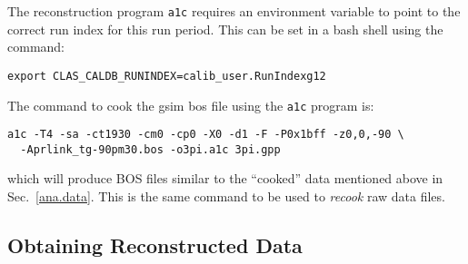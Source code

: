 The reconstruction program \texttt{a1c} requires an environment variable to point to the correct run index for this run period. This can be set in a bash shell using the command:
\begin{verbatim}
export CLAS_CALDB_RUNINDEX=calib_user.RunIndexg12
\end{verbatim}
The command to cook the gsim bos file using the \texttt{a1c} program is:
\begin{verbatim}
a1c -T4 -sa -ct1930 -cm0 -cp0 -X0 -d1 -F -P0x1bff -z0,0,-90 \
  -Aprlink_tg-90pm30.bos -o3pi.a1c 3pi.gpp
\end{verbatim}
which will produce BOS files similar to the ``cooked'' data mentioned above in Sec.~\ref{ana.data}. This is the same command to be used to \emph{recook} raw data files.

\FloatBarrier





\subsection{\label{sec:data.pass1}Obtaining Reconstructed Data}

